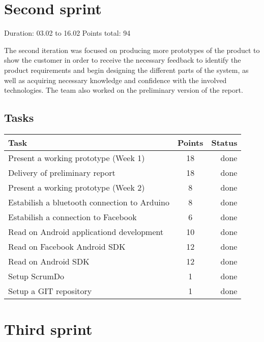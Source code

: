 \newpage


\section{Second sprint}

Duration: 03.02 to 16.02
Points total: 94

The second iteration was focused on producing more prototypes of the product to
show the customer in order to receive the necessary feedback to identify
the product requirements and begin designing the different parts of the system,
as well as acquiring necessary knowledge and confidence with the involved
technologies. The team also worked on the preliminary version of the report.

\subsection{Tasks}

\begin{table}[ht!]
\begin{tabular}{ | l | c | r | }

\hline
\textbf{Task} & \textbf{Points} & \textbf{Status} \\
\hline

Present a working prototype	(Week 1)			& 18 & done \\
\hline
Delivery of preliminary report					& 18 & done \\
\hline
Present a working prototype	(Week 2)			& 8  & done \\
\hline
Estabilish a bluetooth connection to Arduino	& 8  & done \\
\hline
Estabilish a connection to Facebook				& 6  & done \\
\hline
Read on Android applicationd development		& 10 & done \\
\hline
Read on Facebook Android SDK					& 12 & done \\
\hline
Read on Android SDK								& 12 & done \\
\hline
Setup ScrumDo									& 1  & done \\
\hline
Setup a GIT repository							& 1  & done \\
\hline

\end{tabular}
\end{table}


\newpage


\section{Third sprint}

